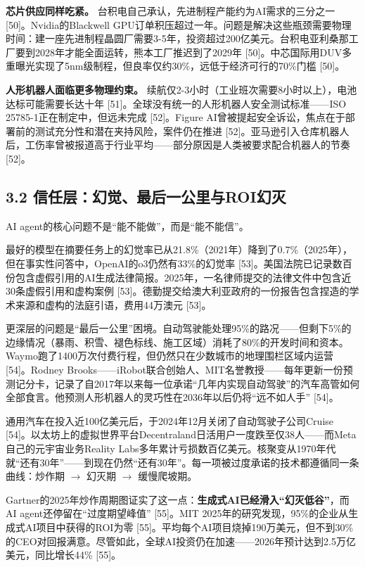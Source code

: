 \documentclass[11pt,a4paper]{ctexart}
\begin{document}
\textbf{芯片供应同样吃紧。} 台积电自己承认，先进制程产能约为AI需求的三分之一 [50]。Nvidia的Blackwell GPU订单积压超过一年。问题是解决这些瓶颈需要物理时间：建一座先进制程晶圆厂需要3-5年，投资超过200亿美元。台积电亚利桑那工厂要到2028年才能全面运转，熊本工厂推迟到了2029年 [50]。中芯国际用DUV多重曝光实现了5nm级制程，但良率仅约30\%，远低于经济可行的70\%门槛 [50]。

\textbf{人形机器人面临更多物理约束。} 续航仅2-3小时（工业班次需要8小时以上），电池达标可能需要长达十年 [51]。全球没有统一的人形机器人安全测试标准——ISO 25785-1正在制定中，但远未完成 [52]。Figure AI曾被提起安全诉讼，焦点在于部署前的测试充分性和潜在夹持风险，案件仍在推进 [52]。亚马逊引入仓库机器人后，工伤率曾被报道高于行业平均——部分原因是人类被要求配合机器人的节奏 [52]。

\subsection{3.2 信任层：幻觉、最后一公里与ROI幻灭}

AI agent的核心问题不是“能不能做”，而是“能不能信”。

最好的模型在摘要任务上的幻觉率已从21.8\%（2021年）降到了0.7\%（2025年），但在事实性问答中，OpenAI的o3仍然有33\%的幻觉率 [53]。美国法院已记录数百份包含虚假引用的AI生成法律简报。2025年，一名律师提交的法律文件中包含近30条虚假引用和虚构案例 [53]。德勤提交给澳大利亚政府的一份报告包含捏造的学术来源和虚构的法庭引语，费用44万澳元 [53]。

更深层的问题是“最后一公里”困境。自动驾驶能处理95\%的路况——但剩下5\%的边缘情况（暴雨、积雪、褪色标线、施工区域）消耗了80\%的开发时间和资本。Waymo跑了1400万次付费行程，但仍然只在少数城市的地理围栏区域内运营 [54]。Rodney Brooks——iRobot联合创始人、MIT名誉教授——每年更新一份预测记分卡，记录了自2017年以来每一位承诺“几年内实现自动驾驶”的汽车高管如何全部食言。他预测人形机器人的灵巧性在2036年以后仍将“远不如人手” [54]。

通用汽车在投入近100亿美元后，于2024年12月关闭了自动驾驶子公司Cruise [54]。以太坊上的虚拟世界平台Decentraland日活用户一度跌至仅38人——而Meta自己的元宇宙业务Reality Labs多年累计亏损数百亿美元。核聚变从1970年代就“还有30年”——到现在仍然“还有30年”。每一项被过度承诺的技术都遵循同一条曲线：炒作期 $\to$ 幻灭期 $\to$ 缓慢爬坡期。

Gartner的2025年炒作周期图证实了这一点：\textbf{生成式AI已经滑入“幻灭低谷”}，而AI agent还停留在“过度期望峰值” [55]。MIT 2025年的研究发现，95\%的企业从生成式AI项目中获得的ROI为零 [55]。平均每个AI项目烧掉190万美元，但不到30\%的CEO对回报满意。尽管如此，全球AI投资仍在加速——2026年预计达到2.5万亿美元，同比增长44\% [55]。
\end{document}
